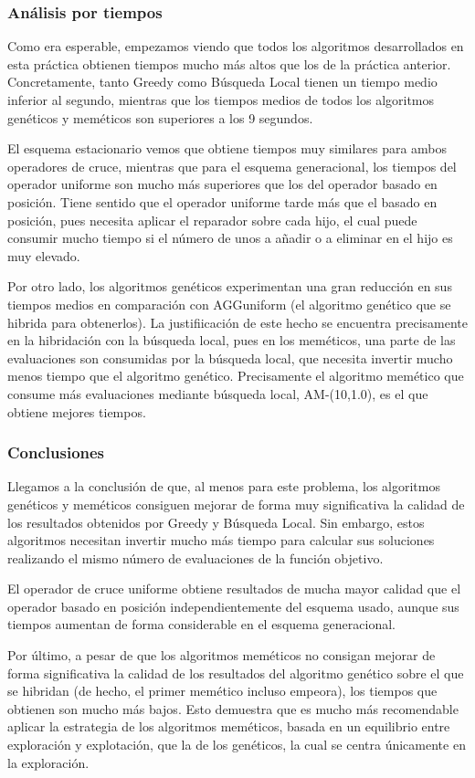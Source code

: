 \documentclass[10pt,a4paper]{article}
\begin{document}
\subsubsection{Análisis por tiempos}

Como era esperable, empezamos viendo que todos los algoritmos desarrollados en esta práctica obtienen tiempos mucho más altos que los de la práctica anterior. Concretamente, tanto Greedy como Búsqueda Local tienen un tiempo medio inferior al segundo, mientras que los tiempos medios de todos los algoritmos genéticos y meméticos son superiores a los 9 segundos.

El esquema estacionario vemos que obtiene tiempos muy similares para ambos operadores de cruce, mientras que para el esquema generacional, los tiempos del operador uniforme son mucho más superiores que los del operador basado en posición. Tiene sentido que el operador uniforme tarde más que el basado en posición, pues necesita aplicar el reparador sobre cada hijo, el cual puede consumir mucho tiempo si el número de unos a añadir o a eliminar en el hijo es muy elevado.

Por otro lado, los algoritmos genéticos experimentan una gran reducción en sus tiempos medios en comparación con AGGuniform (el algoritmo genético que se hibrida para obtenerlos). La justifiicación de este hecho se encuentra precisamente en la hibridación con la búsqueda local, pues en los meméticos, una parte de las evaluaciones son consumidas por la búsqueda local, que necesita invertir mucho menos tiempo que el algoritmo genético. Precisamente el algoritmo memético que consume más evaluaciones mediante búsqueda local, AM-(10,1.0), es el que obtiene mejores tiempos.




\subsubsection{Conclusiones}

Llegamos a la conclusión de que, al menos para este problema, los algoritmos genéticos y meméticos consiguen mejorar de forma muy significativa la calidad de los resultados obtenidos por Greedy y Búsqueda Local. Sin embargo, estos algoritmos necesitan invertir mucho más tiempo para calcular sus soluciones realizando el mismo número de evaluaciones de la función objetivo.

El operador de cruce uniforme obtiene resultados de mucha mayor calidad que el operador basado en posición independientemente del esquema usado, aunque sus tiempos aumentan de forma considerable en el esquema generacional.

Por último, a pesar de que los algoritmos meméticos no consigan mejorar de forma significativa la calidad de los resultados del algoritmo genético sobre el que se hibridan (de hecho, el primer memético incluso empeora), los tiempos que obtienen son mucho más bajos. Esto demuestra que es mucho más recomendable aplicar la estrategia de los algoritmos meméticos, basada en un equilibrio entre exploración y explotación, que la de los genéticos, la cual se centra únicamente en la exploración.
\end{document}

